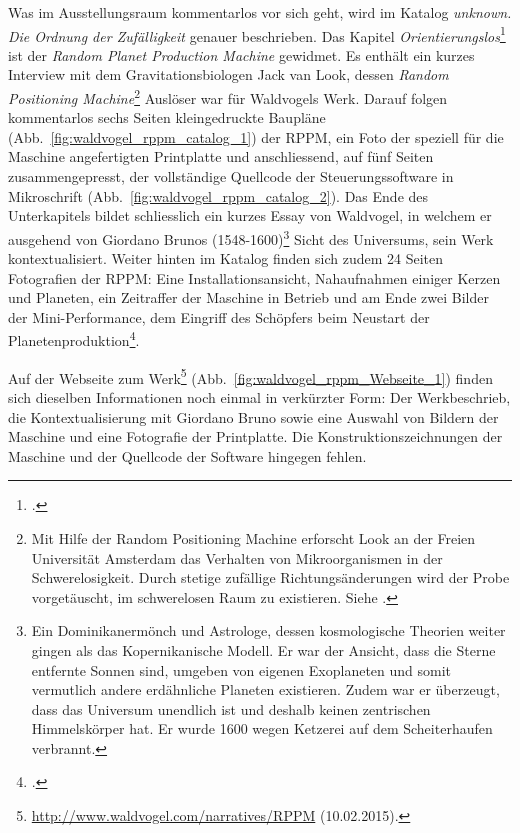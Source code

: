 \documentclass[
paper=164mm:234mm, %
pagesize, %
DIV=calc, %
10pt, %
BCOR=0mm, %
parskip=half- %
]{scrbook}
\begin{document}
Was im Ausstellungsraum kommentarlos vor sich geht, wird im Katalog \emph{unknown. Die Ordnung der Zufälligkeit} genauer beschrieben. Das Kapitel \emph{Orientierungslos}\footnote{\cite[13-36]{Waldvogel:2014}.} ist der \emph{Random Planet Production Machine} gewidmet. Es enthält ein kurzes Interview mit dem Gravitationsbiologen Jack van Look, dessen \emph{Random Positioning Machine}\footnote{Mit Hilfe der Random Positioning Machine erforscht Look an der Freien Universität Amsterdam das Verhalten von Mikroorganismen in der Schwerelosigkeit. Durch stetige zufällige Richtungsänderungen wird der Probe vorgetäuscht, im schwerelosen Raum zu existieren. Siehe \cite[15]{Waldvogel:2014}.} Auslöser war für Waldvogels Werk. Darauf folgen kommentarlos sechs Seiten kleingedruckte Baupläne (Abb.~\ref{fig:waldvogel_rppm_catalog_1}) der RPPM, ein Foto der speziell für die Maschine angefertigten Printplatte und anschliessend, auf fünf Seiten zusammengepresst, der vollständige Quellcode der Steuerungssoftware in Mikroschrift (Abb.~\ref{fig:waldvogel_rppm_catalog_2}). Das Ende des Unterkapitels bildet schliesslich ein kurzes Essay von Waldvogel, in welchem er ausgehend von Giordano Brunos (1548-1600)\footnote{Ein Dominikanermönch und Astrologe, dessen kosmologische Theorien weiter gingen als das Kopernikanische Modell. Er war der Ansicht, dass die Sterne entfernte Sonnen sind, umgeben von eigenen Exoplaneten und somit vermutlich andere erdähnliche Planeten existieren. Zudem war er überzeugt, dass das Universum unendlich ist und deshalb keinen zentrischen Himmelskörper hat. Er wurde 1600 wegen Ketzerei auf dem Scheiterhaufen verbrannt.} Sicht des Universums, sein Werk kontextualisiert. Weiter hinten im Katalog finden sich zudem 24 Seiten Fotografien der RPPM: Eine Installationsansicht, Nahaufnahmen einiger Kerzen und Planeten, ein Zeitraffer der Maschine in Betrieb und am Ende zwei Bilder der Mini-Performance, dem Eingriff des Schöpfers beim Neustart der Planetenproduktion\footnote{\cite[112-135]{Waldvogel:2014}.}.

Auf der Webseite zum Werk\footnote{\url{http://www.waldvogel.com/narratives/RPPM} (10.02.2015).} (Abb.~\ref{fig:waldvogel_rppm_Webseite_1}) finden sich dieselben Informationen noch einmal in verkürzter Form: Der Werkbeschrieb, die Kontextualisierung mit Giordano Bruno sowie eine Auswahl von Bildern der Maschine und eine Fotografie der Printplatte. Die Konstruktionszeichnungen der Maschine und der Quellcode der Software hingegen fehlen.
\end{document}
